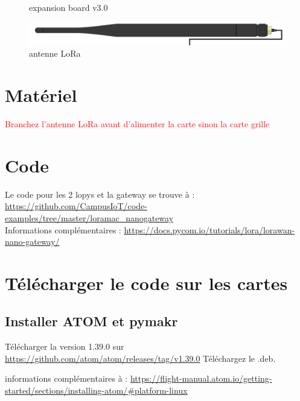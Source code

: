 \documentclass{article}
\begin{document}
\begin{figure}[H]
\begin{minipage}[b]{0.4\textwidth}
    \caption{expansion board v3.0}
  \end{minipage}
\end{figure}

    \begin{figure}[H]
\begin{center}
\advance\leftskip-3cm
\advance\rightskip-3cm
\includegraphics[keepaspectratio=true,scale=0.2]{lora_antenna.png}
\caption{antenne LoRa}
\label{visina8}
\end{center}\end{figure}



\section{Matériel}
\textcolor{red}{Branchez l'antenne LoRa avant d'alimenter la carte sinon la carte grille}

\section{Code}

Le code pour les 2 lopys et la gateway se trouve à : \url{https://github.com/CampusIoT/code-examples/tree/master/loramac_nanogateway}\\
Informations complémentaires : \url{https://docs.pycom.io/tutorials/lora/lorawan-nano-gateway/} 

\section{Télécharger le code sur les cartes}
\subsection{Installer ATOM et pymakr}

Télécharger la version 1.39.0 sur \url{https://github.com/atom/atom/releases/tag/v1.39.0}
Téléchargez le .deb. \\

informations complémentaires à : \url{https://flight-manual.atom.io/getting-started/sections/installing-atom/#platform-linux}
\end{document}
